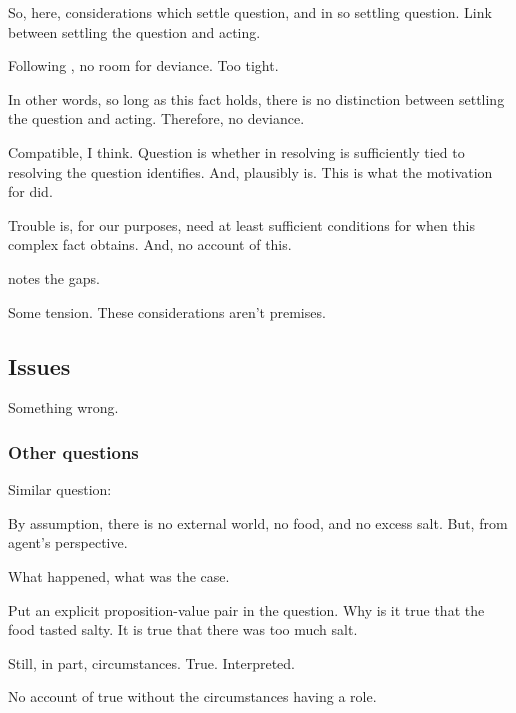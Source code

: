\begin{note}
  So, here, considerations which settle question, and in so settling question.
  Link between settling the question and acting.

  Following \citeauthor{Hieronymi:2011aa}, no room for deviance.
  Too tight.

  In other words, so long as this fact holds, there is no distinction between settling the question and acting.
  Therefore, no deviance.

  Compatible, I think.
  Question is whether in resolving \qzS{} is sufficiently tied to resolving the question \citeauthor{Hieronymi:2011aa} identifies.
  And, plausibly is.
  This is what the motivation for \qzS{} did.

  Trouble is, for our purposes, need at least sufficient conditions for when this complex fact obtains.
  And, no account of this.

  \citeauthor{Hieronymi:2011aa} notes the gaps.

  Some tension.
  These considerations aren't premises.
\end{note}

\subsection{Issues}
\label{sec:issues}

\begin{note}
  Something wrong.
\end{note}

\subsubsection{Other questions}
\label{sec:other-questions}

\nocite{Smith:1988aa,Smith:1987tz}

\begin{note}
  Similar question:

  By assumption, there is no external world, no food, and no excess salt.
  But, from agent's perspective.

  What happened, what was the case.
\end{note}

\begin{note}
  Put an explicit proposition-value pair in the question.
  Why is it true that the food tasted salty.
  It is true that there was too much salt.

  Still, in part, circumstances.
  True.
  Interpreted.

  No account of true without the circumstances having a role.
\end{note}

